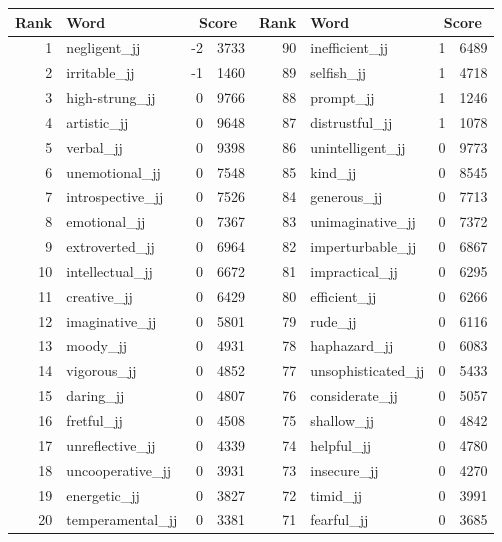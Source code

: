 \begin{table}[tbp]
    \begin{tabular}{| rlr@{.}l | rlr@{.}l |}
    \hline
    \textbf{Rank} & \textbf{Word} & \multicolumn{2}{c|}{\textbf{Score}} & \textbf{Rank} & \textbf{Word} & \multicolumn{2}{c|}{\textbf{Score}} \\
    \hline
    1 & negligent\_jj & -2 & 3733    &    90 & inefficient\_jj & 1 & 6489 \\
    2 & irritable\_jj & -1 & 1460    &    89 & selfish\_jj & 1 & 4718 \\
    3 & high-strung\_jj & 0 & 9766    &    88 & prompt\_jj & 1 & 1246 \\
    4 & artistic\_jj & 0 & 9648    &    87 & distrustful\_jj & 1 & 1078 \\
    5 & verbal\_jj & 0 & 9398    &    86 & unintelligent\_jj & 0 & 9773 \\
    6 & unemotional\_jj & 0 & 7548    &    85 & kind\_jj & 0 & 8545 \\
    7 & introspective\_jj & 0 & 7526    &    84 & generous\_jj & 0 & 7713 \\
    8 & emotional\_jj & 0 & 7367    &    83 & unimaginative\_jj & 0 & 7372 \\
    9 & extroverted\_jj & 0 & 6964    &    82 & imperturbable\_jj & 0 & 6867 \\
    10 & intellectual\_jj & 0 & 6672    &    81 & impractical\_jj & 0 & 6295 \\
    11 & creative\_jj & 0 & 6429    &    80 & efficient\_jj & 0 & 6266 \\
    12 & imaginative\_jj & 0 & 5801    &    79 & rude\_jj & 0 & 6116 \\
    13 & moody\_jj & 0 & 4931    &    78 & haphazard\_jj & 0 & 6083 \\
    14 & vigorous\_jj & 0 & 4852    &    77 & unsophisticated\_jj & 0 & 5433 \\
    15 & daring\_jj & 0 & 4807    &    76 & considerate\_jj & 0 & 5057 \\
    16 & fretful\_jj & 0 & 4508    &    75 & shallow\_jj & 0 & 4842 \\
    17 & unreflective\_jj & 0 & 4339    &    74 & helpful\_jj & 0 & 4780 \\
    18 & uncooperative\_jj & 0 & 3931    &    73 & insecure\_jj & 0 & 4270 \\
    19 & energetic\_jj & 0 & 3827    &    72 & timid\_jj & 0 & 3991 \\
    20 & temperamental\_jj & 0 & 3381    &    71 & fearful\_jj & 0 & 3685 \\

\end{tabular}
\end{table}
